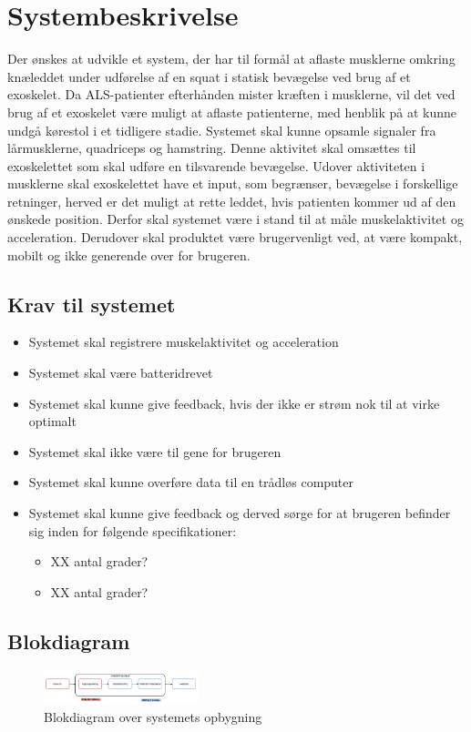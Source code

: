 \section{Systembeskrivelse}
Der ønskes at udvikle et system, der har til formål at aflaste musklerne omkring knæleddet under udførelse af en squat i statisk bevægelse ved brug af et exoskelet. Da ALS-patienter efterhånden mister kræften i musklerne, vil det ved brug af et exoskelet være muligt at aflaste patienterne, med henblik på at kunne undgå kørestol i et tidligere stadie. Systemet skal kunne opsamle signaler fra lårmusklerne, quadriceps og hamstring. Denne aktivitet skal omsættes til exoskelettet som skal udføre en tilsvarende bevægelse. Udover aktiviteten i musklerne skal exoskelettet have et input, som begrænser, bevægelse i forskellige retninger, herved er det muligt at rette leddet, hvis patienten kommer ud af den ønskede position. Derfor skal systemet være i stand til at måle muskelaktivitet og acceleration. Derudover skal produktet være brugervenligt ved, at være kompakt, mobilt og ikke generende over for brugeren.

\subsection{Krav til systemet} 
\begin{itemize}
\item Systemet skal registrere muskelaktivitet og acceleration
\item Systemet skal være batteridrevet
\item Systemet skal kunne give feedback, hvis der ikke er strøm nok til at virke optimalt
\item Systemet skal ikke være til gene for brugeren
\item Systemet skal kunne overføre data til en trådløs computer
\item Systemet skal kunne give feedback og derved sørge for at brugeren befinder sig inden for følgende specifikationer:
\begin{itemize}
\item XX antal grader?
\item XX antal grader?
\end{itemize}
\end{itemize}


\subsection{Blokdiagram}
\begin{figure}[H]
\centering
\includegraphics[width=0.4\textwidth]{figures/blokdiagram.png}
\caption{Blokdiagram over systemets opbygning}
\label{fig:blokdiagram}
\end{figure}

